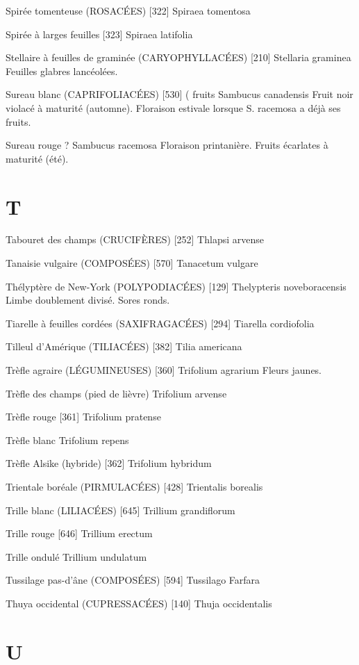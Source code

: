 \documentclass[book,12pt,a4paper,onecolumn,openany]{memoir}
\begin{document}
Spirée tomenteuse (ROSACÉES)  [322]
				Spiraea tomentosa

Spirée à larges feuilles  [323]
				Spiraea latifolia

Stellaire à feuilles de graminée (CARYOPHYLLACÉES)  [210]
				Stellaria graminea
Feuilles glabres lancéolées.

Sureau blanc (CAPRIFOLIACÉES)  [530]			( fruits
				Sambucus canadensis
Fruit noir violacé à maturité (automne). Floraison estivale lorsque S. racemosa a déjà ses fruits.

Sureau rouge								?
				Sambucus racemosa
Floraison printanière. Fruits écarlates à maturité (été).

\chapter*{T}

Tabouret des champs (CRUCIFÈRES)  [252]
				Thlapsi arvense

Tanaisie vulgaire (COMPOSÉES)  [570]
				Tanacetum vulgare

Thélyptère de New-York (POLYPODIACÉES) [129]
				Thelypteris noveboracensis
Limbe doublement divisé. Sores ronds.

Tiarelle à feuilles cordées (SAXIFRAGACÉES)  [294]
				Tiarella cordiofolia

Tilleul d’Amérique (TILIACÉES)  [382]
				Tilia americana

Trèfle agraire (LÉGUMINEUSES)  [360]
				Trifolium agrarium
Fleurs jaunes.

Trèfle des champs (pied de lièvre)
				Trifolium arvense

Trèfle rouge  [361]
				Trifolium pratense


Trèfle blanc
				Trifolium repens

Trèfle Alsike (hybride)  [362]
				Trifolium hybridum

Trientale boréale (PIRMULACÉES)  [428]
				Trientalis borealis

Trille blanc (LILIACÉES)  [645]
				Trillium grandiflorum

Trille rouge  [646]
				Trillium erectum

Trille ondulé
				Trillium undulatum

Tussilage pas-d’âne (COMPOSÉES)  [594]
				Tussilago Farfara

Thuya occidental (CUPRESSACÉES) [140]
				Thuja occidentalis

\chapter*{U}
\end{document}
